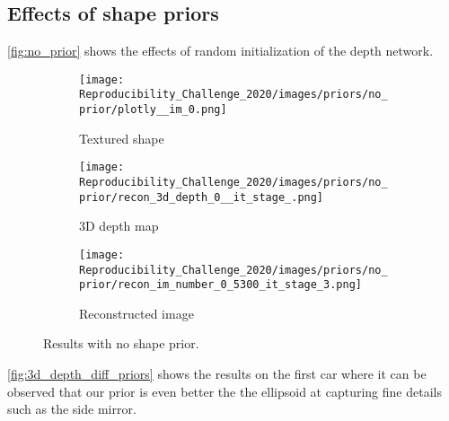 \subsection{Effects of shape priors}
\autoref{fig:no_prior} shows the effects of random initialization of the depth network.
\begin{figure}[!htb]
\centering
\begin{subfigure}{0.30\textwidth}
    \centering
    \texttt{[image: Reproducibility\_Challenge\_2020/images/priors/no\_prior/plotly\_\_im\_0.png]}
    \caption{Textured shape}
    \label{}
\end{subfigure}
\begin{subfigure}{0.30\textwidth}
    \centering
    \texttt{[image: Reproducibility\_Challenge\_2020/images/priors/no\_prior/recon\_3d\_depth\_0\_\_it\_stage\_.png]}
    \caption{3D depth map}
    \label{}
\end{subfigure}
\begin{subfigure}{0.30\textwidth}
    \centering
    \texttt{[image: Reproducibility\_Challenge\_2020/images/priors/no\_prior/recon\_im\_number\_0\_5300\_it\_stage\_3.png]}
    \caption{Reconstructed image}
    \label{}
\end{subfigure}
    \caption{Results with no shape prior.}
    \label{fig:no_prior}
\end{figure}
\autoref{fig:3d_depth_diff_priors} shows the results on the first car where it can be observed that our prior is even better the the ellipsoid at capturing fine details such as the side mirror.
